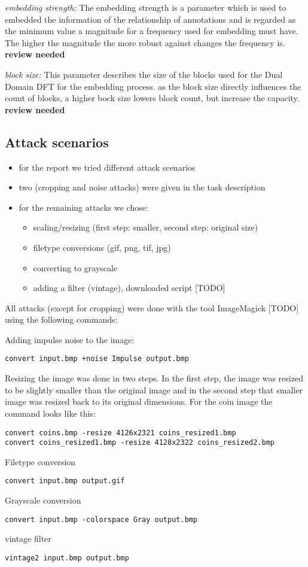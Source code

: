 \textit{embedding strength:}
The embedding strength is a parameter which is used to embedded the information of the relationship of annotations and is regarded as the minimum value a magnitude for a frequency used for embedding must have. The higher the magnitude the more robust against changes the frequency is.\cite{Vielhauer2009}
\textbf{review needed}
   
\textit{block size:}
This parameter describes the size of the blocks used for the Dual Domain DFT for the embedding process. as the block size directly influences the count of blocks, a higher bock size lowers block count, but increase the capacity.\cite{Vielhauer2009}
\textbf{review needed}
 
\subsection{Attack scenarios}

\begin{itemize}
    \item for the report we tried different attack scenarios
    \item two (cropping and noise attacks) were given in the task description
    \item for the remaining attacks we chose:
    \begin{itemize}
        \item scaling/resizing (first step: smaller, second step: original size)
        \item filetype conversions (gif, png, tif, jpg)
        \item converting to grayscale
        \item adding a filter (vintage), downloaded script [TODO]
    \end{itemize}
\end{itemize}

All attacks (except for cropping) were done with the tool ImageMagick [TODO] using the following commands:

Adding impulse noise to the image:
\begin{verbatim}
convert input.bmp +noise Impulse output.bmp 
\end{verbatim}

Resizing the image was done in two steps. In the first step, the image was resized to be slightly smaller than the 
original image and in the second step that smaller image was resized back to its original dimensions.
For the coin image the command looks like this:
\begin{verbatim}
convert coins.bmp -resize 4126x2321 coins_resized1.bmp
convert coins_resized1.bmp -resize 4128x2322 coins_resized2.bmp
\end{verbatim}

Filetype conversion
\begin{verbatim}
convert input.bmp output.gif
\end{verbatim}

Grayscale conversion
\begin{verbatim}
convert input.bmp -colorspace Gray output.bmp
\end{verbatim}

vintage filter
\begin{verbatim}
vintage2 input.bmp output.bmp
\end{verbatim}

